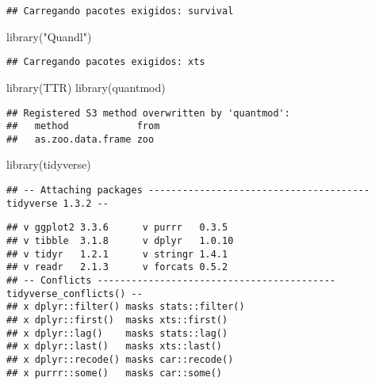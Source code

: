 \documentclass[
]{article}
\newenvironment{Shaded}{\begin{snugshade}}{\end{snugshade}}
\newcommand{\FunctionTok}[1]{\textcolor[rgb]{0.00,0.00,0.00}{#1}}
\newcommand{\NormalTok}[1]{#1}
\newcommand{\StringTok}[1]{\textcolor[rgb]{0.31,0.60,0.02}{#1}}
\begin{document}
\begin{verbatim}
## Carregando pacotes exigidos: survival
\end{verbatim}

\begin{Shaded}
\begin{Highlighting}[]
\FunctionTok{library}\NormalTok{(}\StringTok{"Quandl"}\NormalTok{)}
\end{Highlighting}
\end{Shaded}

\begin{verbatim}
## Carregando pacotes exigidos: xts
\end{verbatim}

\begin{Shaded}
\begin{Highlighting}[]
\FunctionTok{library}\NormalTok{(}\StringTok{\textquotesingle{}TTR\textquotesingle{}}\NormalTok{)}
\FunctionTok{library}\NormalTok{(}\StringTok{\textquotesingle{}quantmod\textquotesingle{}}\NormalTok{)}
\end{Highlighting}
\end{Shaded}

\begin{verbatim}
## Registered S3 method overwritten by 'quantmod':
##   method            from
##   as.zoo.data.frame zoo
\end{verbatim}

\begin{Shaded}
\begin{Highlighting}[]
\FunctionTok{library}\NormalTok{(}\StringTok{\textquotesingle{}tidyverse\textquotesingle{}}\NormalTok{)}
\end{Highlighting}
\end{Shaded}

\begin{verbatim}
## -- Attaching packages --------------------------------------- tidyverse 1.3.2 --
\end{verbatim}

\begin{verbatim}
## v ggplot2 3.3.6      v purrr   0.3.5 
## v tibble  3.1.8      v dplyr   1.0.10
## v tidyr   1.2.1      v stringr 1.4.1 
## v readr   2.1.3      v forcats 0.5.2 
## -- Conflicts ------------------------------------------ tidyverse_conflicts() --
## x dplyr::filter() masks stats::filter()
## x dplyr::first()  masks xts::first()
## x dplyr::lag()    masks stats::lag()
## x dplyr::last()   masks xts::last()
## x dplyr::recode() masks car::recode()
## x purrr::some()   masks car::some()
\end{verbatim}
\end{document}
